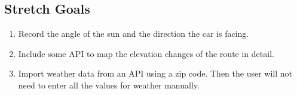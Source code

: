 \documentclass[onecolumn, draftclsnofoot,10pt, compsoc]{IEEEtran}
\begin{document}
    \subsection{Stretch Goals}
    \begin{enumerate}
        \item Record the angle of the sun and the direction the car is facing.
        \item Include some API to map the elevation changes of the route in detail. 
        \item Import weather data from an API using a zip code. Then the user will not need to enter all the values for weather manually.
    \end{enumerate}
\end{document}
